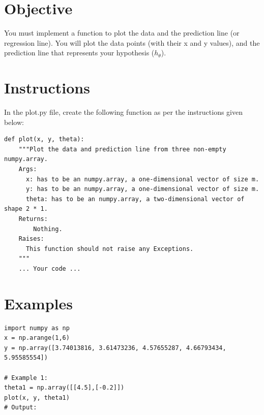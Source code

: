 \documentclass{42-en}
\begin{document}

\section*{Objective}
You must implement a function to plot the data and the prediction line (or regression line).  
You will plot the data points (with their x and y values), and the prediction line that represents your hypothesis ($h_{\theta}$).

\newpage

\section*{Instructions}
In the plot.py file, create the following function as per the instructions given below:

\begin{verbatim}
def plot(x, y, theta):
    """Plot the data and prediction line from three non-empty numpy.array.
    Args:
      x: has to be an numpy.array, a one-dimensional vector of size m.
      y: has to be an numpy.array, a one-dimensional vector of size m.
      theta: has to be an numpy.array, a two-dimensional vector of shape 2 * 1.
    Returns:
        Nothing.
    Raises:
      This function should not raise any Exceptions.
    """
    ... Your code ...
\end{verbatim}

\section*{Examples}

\begin{verbatim}
import numpy as np
x = np.arange(1,6)
y = np.array([3.74013816, 3.61473236, 4.57655287, 4.66793434, 5.95585554])

# Example 1:
theta1 = np.array([[4.5],[-0.2]])
plot(x, y, theta1)
# Output:
\end{verbatim}
\end{document}
